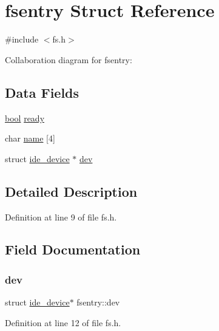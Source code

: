 \hypertarget{a00226}{}\section{fsentry Struct Reference}
\label{a00226}


{\ttfamily \#include $<$fs.\+h$>$}



Collaboration diagram for fsentry\+:
\subsection*{Data Fields}
\begin{DoxyCompactItemize}
\item 
\hyperlink{a00116_af6a258d8f3ee5206d682d799316314b1_af6a258d8f3ee5206d682d799316314b1}{bool} \hyperlink{a00226_a284522ed97fe1eeebd0fcc039b2ea00a_a284522ed97fe1eeebd0fcc039b2ea00a}{ready}
\item 
char \hyperlink{a00226_a9c5a4f5b02eb2c9e9e797f79dc99028a_a9c5a4f5b02eb2c9e9e797f79dc99028a}{name} \mbox{[}4\mbox{]}
\item 
struct \hyperlink{a00178}{ide\+\_\+device} $\ast$ \hyperlink{a00226_aaea66ea744fa50f1c54666033884d8d2_aaea66ea744fa50f1c54666033884d8d2}{dev}
\end{DoxyCompactItemize}


\subsection{Detailed Description}


Definition at line 9 of file fs.\+h.



\subsection{Field Documentation}
\mbox{\label{a00226_aaea66ea744fa50f1c54666033884d8d2_aaea66ea744fa50f1c54666033884d8d2}} 
\subsubsection{\texorpdfstring{dev}{dev}}
{\footnotesize\ttfamily struct \hyperlink{a00178}{ide\+\_\+device}$\ast$ fsentry\+::dev}



Definition at line 12 of file fs.\+h.

